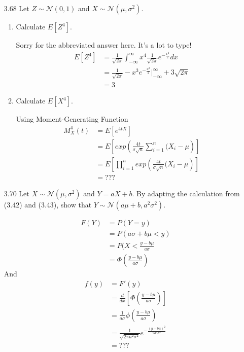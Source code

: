 \documentclass[10pt]{article}
\begin{document}
\begin{itemize}
\newpage
    \item[3.68]  Let $Z \sim \mathcal{N}(0,1)$ and $X \sim \mathcal{N}\left(\mu, \sigma^{2}\right)$.

    \begin{enumerate}
      \item  Calculate $E\left[Z^{4}\right]$.

        Sorry for the abbreviated answer here.  It's a lot to type!
        \begin{align*}
          E[Z^4] &= \frac{1}{\sqrt{2\pi}} \int_{-\infty}^{\infty} x^4 \frac{1}{\sqrt{2\pi}}
            e^{-\frac{x^2}{2}}  d{x} \\
                 &= \frac{1}{\sqrt{2\pi}} -x^3 e^{-\frac{x^2}{2}} \biggr\rvert_{-\infty}^{\infty} + 3 \sqrt{2\pi} \\
                &= 3
        \end{align*}

      \item  Calculate $E\left[X^{4}\right]$.

        Using Moment-Generating Function
        \begin{align*}
          M_X^4(t) &= E[e^{4tX}] \\
                   &= E \left[ exp \left(\frac{4t}{\sigma \sqrt{n}}
                      \sum^{n}_{i=1} (X_i - \mu \right) \right] \\
                   &= E \left[ \prod_{i=1}^n exp \left(\frac{4t}{\sigma \sqrt{n}}
                      (X_i - \mu \right) \right] \\
                  &= ???
        \end{align*}
    \end{enumerate}


\newpage
    \item[3.70]  Let $X \sim \mathcal{N}\left(\mu, \sigma^{2}\right)$ and $Y=a X+b$. By adapting the calculation from (3.42) and (3.43), show that $Y \sim \mathcal{N}\left(a \mu+b, a^{2} \sigma^{2}\right)$.

        \begin{align}
          F(Y) &= P(Y=y) \\
            &= P(a \sigma + b \mu < y) \\
            &= P(X < \frac{y-b \mu}{a \sigma} \\
            &= \Phi( \frac{y-b \mu}{a \sigma} )
        \end{align}
        And
        \begin{align}
          f(y) &= F'(y) \\
               &= \frac{d}{dx} \left[ \Phi \left( \frac{y-b \mu}{a \sigma} \right) \right] \\
               &= \frac{1}{a\sigma} \phi \left( \frac{y-b\mu}{a\sigma} \right) \\
               &= \frac{1}{\sqrt{2 \pi a^2 \sigma^2}} e^{- \frac{(y-b\mu)^2}{2a^2 \sigma^2}} \\
              &= ???
        \end{align}


\end{itemize}
\end{document}
